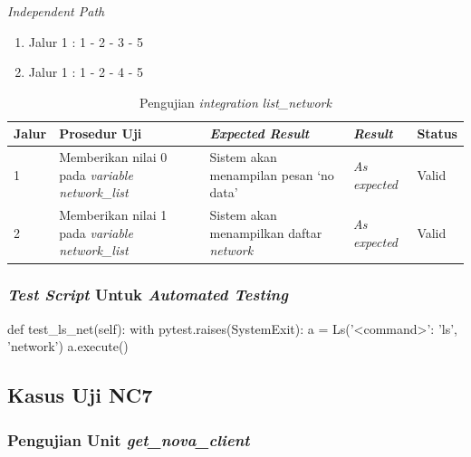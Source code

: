 \noindent
\emph{Independent Path}

\begin{enumerate}
\item Jalur 1 : 1 - 2 - 3 - 5
\item Jalur 1 : 1 - 2 - 4 - 5
\end{enumerate}

\newpage

\begin{longtable}{|P{.06\textwidth}|P{.30\textwidth}|P{.30\textwidth}|P{.10\textwidth}|P{.08\textwidth}|}
  \caption{Pengujian \emph{integration} \emph{list\_network}} \label{jalur:ls-network}\\
  \hline
  \textbf{Jalur} & \textbf{Prosedur Uji} & \textbf{\emph{Expected Result}}
  & \textbf{\emph{Result}} & \textbf{Status} \\\hline
  1 & Memberikan nilai 0 pada \emph{variable network\_list}
                                             & Sistem akan menampilan pesan
                                               `no data' & \emph{As expected} & Valid \\\hline
  2 & Memberikan nilai 1 pada \emph{variable network\_list}  & Sistem akan menampilkan daftar \emph{network} & \emph{As expected} & Valid \\\hline
\end{longtable}

\subsubsection{\emph{Test Script} Untuk \emph{Automated Testing}}

\begin{code}
\begin{ignasicblock}[title=test\_ls\_net,minted language=Python]
def test_ls_net(self):
        with pytest.raises(SystemExit):
            a = Ls({'<command>': 'ls'}, 'network')
            a.execute()
\end{ignasicblock}
\label{ts:ls-network}
\end{code}

\subsection{Kasus Uji NC7}

\subsubsection{Pengujian Unit \emph{get\_nova\_client}}

